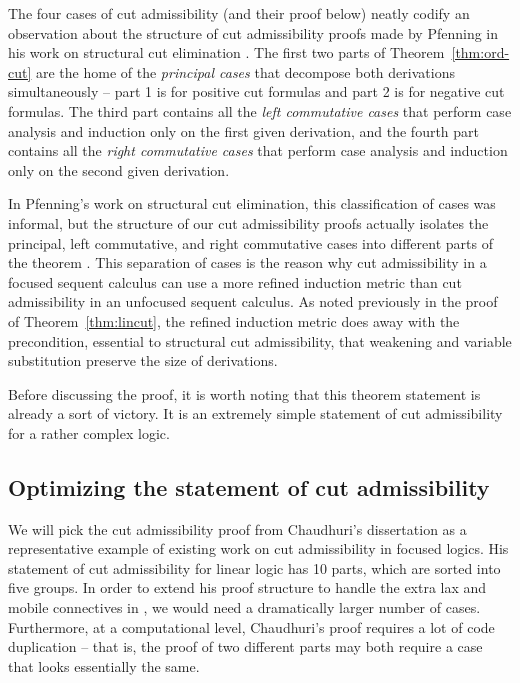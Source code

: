 \noindent
The four cases of cut admissibility (and their proof below) neatly
codify an observation about the structure of cut admissibility proofs
made by Pfenning in his work on structural cut elimination
\cite{pfenning00structural}.  The first two parts of
Theorem~\ref{thm:ord-cut} are the home of the {\it principal cases}
that decompose both derivations simultaneously -- part 1 is for
positive cut formulas and part 2 is for negative cut formulas. The third
part contains all the {\it left commutative cases} that perform case
analysis and induction only on the first given derivation, and the
fourth part contains all the {\it right commutative cases} that
perform case analysis and induction only on the second given
derivation.

In Pfenning's work on structural cut elimination, this classification
of cases was informal, but the structure of our cut admissibility
proofs actually isolates the principal, left commutative, and right
commutative cases into different parts of the theorem
\cite{pfenning00structural}. This separation of cases is the reason
why cut admissibility in a focused sequent calculus can use a more
refined induction metric than cut admissibility in an unfocused
sequent calculus. As noted previously in the proof of
Theorem~\ref{thm:lincut}, the refined induction metric does away with
the precondition, essential to structural cut admissibility, that
weakening and variable substitution preserve the size of derivations.

Before discussing the proof, it is worth noting that this theorem
statement is already a sort of victory. It is an extremely simple
statement of cut admissibility for a rather complex logic.

\subsection{Optimizing the statement of cut admissibility}

We will pick the cut admissibility proof
from Chaudhuri's dissertation \cite{chaudhuri06focused} as a representative
example of existing work on cut admissibility in focused logics.  His
statement of cut admissibility for linear logic has 10 parts, 
which are sorted into
five groups. In order to extend his
proof structure to handle the extra lax and mobile connectives in
\ollll, we would need a dramatically larger number of
cases. Furthermore, at a computational level, Chaudhuri's proof
requires a lot of code duplication -- that is, the proof of two
different parts may both require a case that looks essentially the
same.

